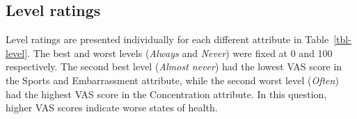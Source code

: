 \documentclass[
  number,
  preprint]{elsarticle}
\begin{document}
\begin{longtable}[]{@{}ll@{}}
\end{longtable}

\subsection{Level ratings}\label{level-ratings-1}

Level ratings are presented individually for each different attribute in
Table~\ref{tbl-level}. The best and worst levels (\textit{Always} and
\textit{Never}) were fixed at 0 and 100 respectively. The second best
level (\textit{Almost never}) had the lowest VAS score in the Sports and
Embarrassment attribute, while the second worst level (\textit{Often})
had the highest VAS score in the Concentration attribute. In this
question, higher VAS scores indicate worse states of health.
\end{document}
